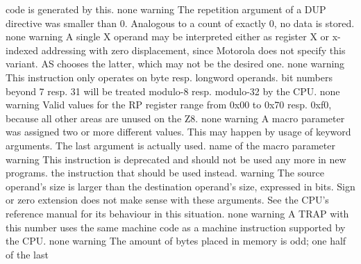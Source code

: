 \documentclass[12pt,twoside]{report}
\newcommand{\asname}{{AS}}
\begin{document}
\begin{description}
{                code is generated by this.}
               {none}
               {warning}
               {The repetition argument of a DUP directive was smaller
                than 0.  Analogous to a count of exactly 0, no data is
                stored.}
               {none}
               {warning}
               {A single X operand may be interpreted either as register X
                or x-indexed addressing with zero displacement, since
                Motorola does not specify this variant.  \asname{} chooses the
                latter, which may not be the desired one.}
               {none}
               {warning}
               {This instruction only operates on byte resp. longword
                operands.  bit numbers beyond 7 resp. 31 will be treated
                modulo-8 resp. modulo-32 by the CPU.}
               {none}
               {warning}
               {Valid values for the RP register range from 0x00 to 0x70 resp.
                0xf0, because all other areas are unused on the Z8.}
               {none}
               {warning}
               {A macro parameter was assigned two or more
                different values.  This may happen by usage of
                keyword arguments.  The last argument is actually
                used.}
               {name of the macro parameter}
               {warning}
               {This instruction is deprecated and should not be used any
                more in new programs.}
               {the instruction that should be used instead.}
               {warning}
               {The source operand's size is larger than the destination operand's
                size, expressed in bits.  Sign or zero extension does not make sense
                with these arguments.  See the CPU's reference manual for its behaviour
                in this situation.}
               {none}
               {warning}
               {A TRAP with this number uses the same machine code as a 
                machine instruction supported by the CPU.}
               {none}
               {warning}
               {The amount of bytes placed in memory is odd; one half of the last
}
\end{description}
\end{document}
